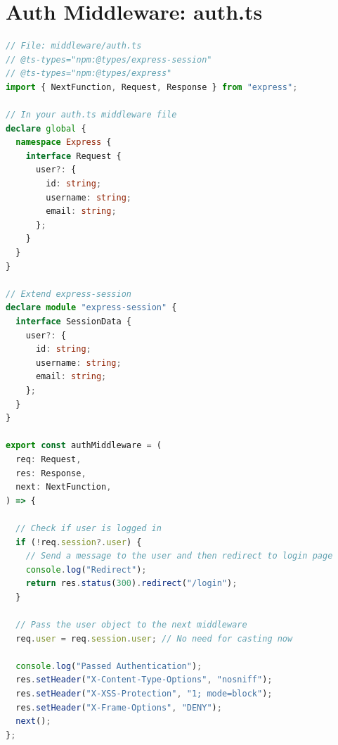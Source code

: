 \documentclass[12pt,a4paper]{report}
\begin{document}
\section{Auth Middleware: auth.ts}
\begin{lstlisting}[language=TypeScript]
// File: middleware/auth.ts
// @ts-types="npm:@types/express-session"
// @ts-types="npm:@types/express"
import { NextFunction, Request, Response } from "express";

// In your auth.ts middleware file
declare global {
  namespace Express {
    interface Request {
      user?: {
        id: string;
        username: string;
        email: string;
      };
    }
  }
}

// Extend express-session
declare module "express-session" {
  interface SessionData {
    user?: {
      id: string;
      username: string;
      email: string;
    };
  }
}

export const authMiddleware = (
  req: Request,
  res: Response,
  next: NextFunction,
) => {

  // Check if user is logged in
  if (!req.session?.user) {
    // Send a message to the user and then redirect to login page
    console.log("Redirect");
    return res.status(300).redirect("/login");
  }

  // Pass the user object to the next middleware
  req.user = req.session.user; // No need for casting now

  console.log("Passed Authentication");
  res.setHeader("X-Content-Type-Options", "nosniff");
  res.setHeader("X-XSS-Protection", "1; mode=block");
  res.setHeader("X-Frame-Options", "DENY");
  next();
};
\end{lstlisting}
\end{document}
